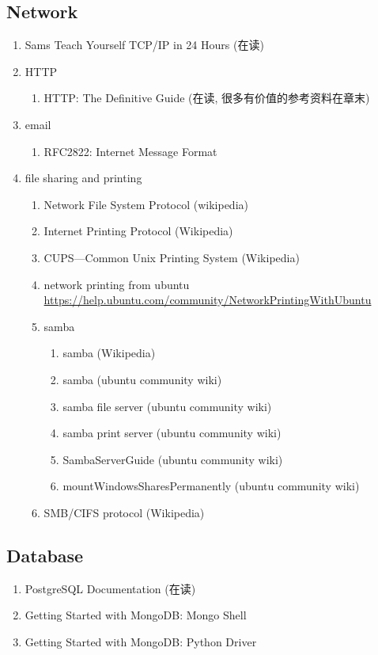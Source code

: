 \documentclass{article}
\begin{document}
\subsection{Network}
\begin{enumerate}
    \item Sams Teach Yourself TCP/IP in 24 Hours (在读)
    \item HTTP
        \begin{enumerate}
            \item HTTP: The Definitive Guide (在读, 很多有价值的参考资料在章末)
        \end{enumerate}
    \item email
        \begin{enumerate}
            \item RFC2822: Internet Message Format
        \end{enumerate}
    \item file sharing and printing
        \begin{enumerate}
            \item Network File System Protocol (wikipedia)
            \item Internet Printing Protocol (Wikipedia)
            \item CUPS---Common Unix Printing System (Wikipedia)
            \item network printing from ubuntu \url{https://help.ubuntu.com/community/NetworkPrintingWithUbuntu}
            \item samba
                \begin{enumerate}
                    \item samba (Wikipedia)
                    \item samba (ubuntu community wiki)
                    \item samba file server (ubuntu community wiki)
                    \item samba print server (ubuntu community wiki)
                    \item SambaServerGuide (ubuntu community wiki)
                    \item mountWindowsSharesPermanently (ubuntu community wiki)
                \end{enumerate}
            \item SMB/CIFS protocol (Wikipedia)
        \end{enumerate}
\end{enumerate}
\subsection{Database}
\begin{enumerate}
    \item PostgreSQL Documentation (在读)
    \item Getting Started with MongoDB: Mongo Shell
    \item Getting Started with MongoDB: Python Driver
\end{enumerate}
\end{document}
